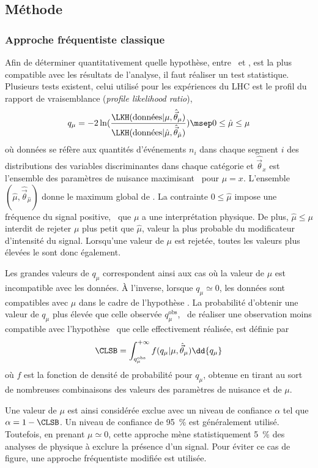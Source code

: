 \subsection{Méthode \CLS}\label{chapter-HTT_analysis-section-signal_extraction-CLS}
\subsubsection{Approche fréquentiste classique}
Afin de déterminer quantitativement quelle hypothèse, entre \hypB\ et \hypSB, est la plus compatible avec les résultats de l'analyse, il faut réaliser un test statistique.
Plusieurs tests existent, celui utilisé pour les expériences du LHC est le profil du rapport de vraisemblance (\emph{profile likelihood ratio}),
\begin{equation}
q_{\mu} = -2 \ln(\frac{\LKH(\text{données} |  \mu, \hat{\vec{\theta}}_{\mu})}{\LKH(\text{données} |  \hat{\mu}, \hat{\vec{\theta}}_{\hat{\mu}})})
\msep
0 \leq \hat{\mu} \leq \mu
\end{equation}
où
\og données \fg{} se réfère aux quantités d'événements $n_i$ dans chaque segment $i$ des distributions des variables discriminantes dans chaque catégorie et
$\hat{\vec{\theta}}_x$ est l'ensemble des paramètres de nuisance maximisant \LKH\ pour $\mu=x$.
L'ensemble $(\hat{\mu},\hat{\vec{\theta}}_{\hat{\mu}})$ donne le maximum global de \LKH.
La contrainte $0 \leq \hat{\mu}$ impose une fréquence du signal positive, \ie\ que $\mu$ a une interprétation physique.
De plus, $\hat{\mu} \leq \mu$ interdit de rejeter $\mu$ plus petit que $\hat{\mu}$, valeur la plus probable du modificateur d'intensité du signal.
Lorsqu'une valeur de $\mu$ est rejetée, toutes les valeurs plus élevées le sont donc également.
\par
Les grandes valeurs de $q_{\mu}$ correspondent ainsi aux cas où la valeur de $\mu$ est incompatible avec les données.
À l'inverse, lorsque $q_{\mu}\simeq0$, les données sont compatibles avec $\mu$ dans le cadre de l'hypothèse \hypSB.
La probabilité d'obtenir une valeur de $q_{\mu}$ plus élevée que celle observée $q_{\mu}^\text{obs}$,
\ie\ de réaliser une observation moins compatible avec l'hypothèse \hypSB\ que celle effectivement réalisée,
est définie par
\begin{equation}
\CLSB = \int_{q_{\mu}^\text{obs}}^{+\infty} f (q_\mu | \mu, \hat{\vec{\theta}}_\mu) \dd{q_\mu}
\end{equation}
où $f$ est la fonction de densité de probabilité pour $q_{\mu}$, obtenue en tirant au sort de nombreuses combinaisons des valeurs des paramètres de nuisance et de $\mu$.
\par
Une valeur de $\mu$ est ainsi considérée exclue avec un niveau de confiance $\alpha$ tel que
$\alpha = 1 - \CLSB$.
Un niveau de confiance de \SI{95}{\%} est généralement utilisé.
Toutefois, en prenant $\mu\simeq0$, cette approche mène statistiquement \SI{5}{\%} des analyses de physique à exclure la présence d'un signal.
Pour éviter ce cas de figure, une approche fréquentiste modifiée est utilisée.

